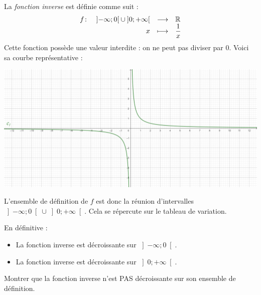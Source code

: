 \documentclass[poly]{mesCours}
\begin{document}
\newpage
\begin{example}
La \emph{fonction inverse} est définie comme suit : 
\begin{equation*}
    \begin{array}[t]{lrcl} f\colon & \left]-\infty;0\right[\cup\left]0;+\infty\right[ & \longrightarrow & \mathbb{R} \\ & x & \longmapsto & \dfrac{1}{x} \end{array}
\end{equation*}
Cette fonction possède une valeur \og interdite \fg : on ne peut pas diviser par $0$. Voici sa courbe représentative :
\begin{center}
\includegraphics[scale=0.7]{Inverse.png}
\end{center}
L'ensemble de définition de $f$ est donc la réunion d'intervalles $\left]-\infty;0\right[\cup\left]0;+\infty\right[$. Cela se répercute sur le tableau de variation.
\begin{center}
\end{center}
En définitive :
\begin{itemize}
\item La fonction inverse est décroissante sur $\left]-\infty;0\right[$.
\item La fonction inverse est décroissante sur $\left]0;+\infty\right[$.
\end{itemize}
Montrer que la fonction inverse n'est PAS décroissante sur son ensemble de définition.

\vspace*{1cm}
\emptybox{5cm}
\end{example}
\newpage
\end{document}
